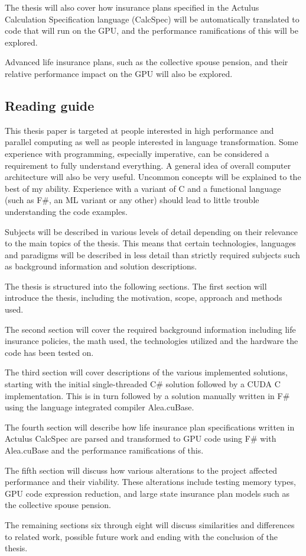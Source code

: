 The thesis will also cover how insurance plans specified in the Actulus Calculation Specification language (CalcSpec) will be automatically translated to code that will run on the GPU, and the performance ramifications of this will be explored.

Advanced life insurance plans, such as the collective spouse pension, and their relative performance impact on the GPU will also be explored.

\subsection{Reading guide}
This thesis paper is targeted at people interested in high performance and parallel computing as well as people interested in language transformation. 
Some experience with programming, especially imperative, can be considered a requirement to fully understand everything. 
A general idea of overall computer architecture will also be very useful. 
Uncommon concepts will be explained to the best of my ability. 
Experience with a variant of C and a functional language (such as F\#, an ML variant or any other) should lead to little trouble understanding the code examples.

Subjects will be described in various levels of detail depending on their relevance to the main topics of the thesis.
This means that certain technologies, languages and paradigms will be described in less detail than strictly required subjects such as background information and solution descriptions.

The thesis is structured into the following sections.
The first section will introduce the thesis, including the motivation, scope, approach and methods used.

The second section will cover the required background information including life insurance policies, the math used, the technologies utilized and the hardware the code has been tested on.

The third section will cover descriptions of the various implemented solutions, starting with the initial single-threaded C\# solution followed by a CUDA C implementation. 
This is in turn followed by a solution manually written in F\# using the language integrated compiler Alea.cuBase.

The fourth section will describe how life insurance plan specifications written in Actulus CalcSpec are parsed and transformed to GPU code using F\# with Alea.cuBase and the performance ramifications of this.

The fifth section will discuss how various alterations to the project affected performance and their viability. 
These alterations include testing memory types, GPU code expression reduction, and large state insurance plan models such as the collective spouse pension.

The remaining sections six through eight will discuss similarities and differences to related work, possible future work and ending with the conclusion of the thesis.